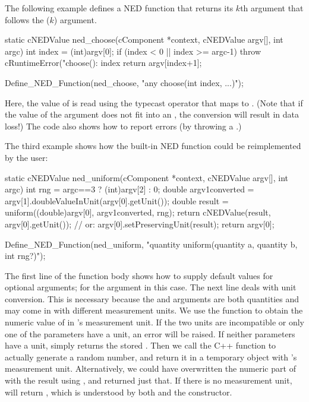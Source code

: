 The following example defines a  NED function that returns
its $k$th argument that follows the  ($k$) argument.

\begin{cpp}
static cNEDValue ned_choose(cComponent *context, cNEDValue argv[], int argc)
{
    int index = (int)argv[0];
    if (index < 0 || index >= argc-1)
        throw cRuntimeError("choose(): index %
    return argv[index+1];
}

Define_NED_Function(ned_choose, "any choose(int index, ...)");
\end{cpp}

Here, the value of  is read using the typecast operator that
maps to . (Note that if the value of the 
argument does not fit into an , the conversion will result
in data loss!) The code also shows how to report errors (by throwing a
.)

The third example shows how the built-in  NED function could
be reimplemented by the user:

\begin{cpp}
static cNEDValue ned_uniform(cComponent *context, cNEDValue argv[], int argc)
{
    int rng = argc==3 ? (int)argv[2] : 0;
    double argv1converted = argv[1].doubleValueInUnit(argv[0].getUnit());
    double result = uniform((double)argv[0], argv1converted, rng);
    return cNEDValue(result, argv[0].getUnit());
    // or: argv[0].setPreservingUnit(result); return argv[0];
}

Define_NED_Function(ned_uniform, "quantity uniform(quantity a, quantity b, int rng?)");
\end{cpp}

The first line of the function body shows how to supply default values for
optional arguments; for the  argument in this case. The next line
deals with unit conversion. This is necessary because the  and
 arguments are both quantities and may come in with different
measurement units. We use the  function to
obtain the numeric value of  in 's measurement unit. If the
two units are incompatible or only one of the parameters have a unit, an
error will be raised. If neither parameters have a unit,
 simply returns the stored . Then we
call the  C++ function to actually generate a random number,
and return it in a temporary object with 's measurement unit.
Alternatively, we could have overwritten the numeric part of  with
the result using , and returned just that. If
there is no measurement unit,  will return ,
which is understood by both  and the
 constructor.

